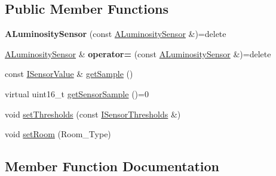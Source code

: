 \subsection*{Public Member Functions}
\begin{DoxyCompactItemize}
\item 
\mbox{\label{classathome_1_1sensor_1_1_a_luminosity_sensor_a550beb44964597870cd5c94a3485bbaf}} 
{\bfseries A\+Luminosity\+Sensor} (const \mbox{\hyperlink{classathome_1_1sensor_1_1_a_luminosity_sensor}{A\+Luminosity\+Sensor}} \&)=delete
\item 
\mbox{\label{classathome_1_1sensor_1_1_a_luminosity_sensor_a9a91cdf883f0f06be50a74ec2e73d710}} 
\mbox{\hyperlink{classathome_1_1sensor_1_1_a_luminosity_sensor}{A\+Luminosity\+Sensor}} \& {\bfseries operator=} (const \mbox{\hyperlink{classathome_1_1sensor_1_1_a_luminosity_sensor}{A\+Luminosity\+Sensor}} \&)=delete
\item 
const \mbox{\hyperlink{structathome_1_1sensor_1_1_i_sensor_1_1_i_sensor_value}{I\+Sensor\+Value}} \& \mbox{\hyperlink{classathome_1_1sensor_1_1_a_luminosity_sensor_a6e0e7bcfe13cd8d8edf6a09f6e230ef8}{get\+Sample}} ()
\item 
virtual uint16\+\_\+t \mbox{\hyperlink{classathome_1_1sensor_1_1_a_luminosity_sensor_ae756f7d7647c2cf695305c8f11aec8d3}{get\+Sensor\+Sample}} ()=0
\item 
void \mbox{\hyperlink{classathome_1_1sensor_1_1_a_luminosity_sensor_aa26ed7176ba600f6900bd249edce71ab}{set\+Thresholds}} (const \mbox{\hyperlink{structathome_1_1sensor_1_1_i_sensor_1_1_i_sensor_thresholds}{I\+Sensor\+Thresholds}} \&)
\item 
void \mbox{\hyperlink{classathome_1_1sensor_1_1_a_luminosity_sensor_a297af24d24717c4167840c933b0bbb9a}{set\+Room}} (Room\+\_\+\+Type)
\end{DoxyCompactItemize}


\subsection{Member Function Documentation}
\mbox{\label{classathome_1_1sensor_1_1_a_luminosity_sensor_a6e0e7bcfe13cd8d8edf6a09f6e230ef8}} 
